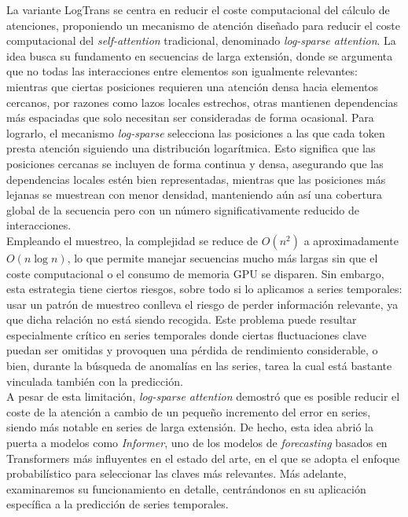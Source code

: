 La variante LogTrans\cite{NEURIPS2019_6775a063} se centra en reducir el coste computacional del cálculo de atenciones, proponiendo un mecanismo de atención diseñado para reducir el coste computacional del \textit{self-attention} tradicional, denominado \textit{log-sparse attention}. La idea busca su fundamento en secuencias de larga extensión, donde se argumenta que no todas las interacciones entre elementos son igualmente relevantes: mientras que ciertas posiciones requieren una atención densa hacia elementos cercanos, por razones como lazos locales estrechos, otras mantienen dependencias más espaciadas que solo necesitan ser consideradas de forma ocasional. Para lograrlo, el mecanismo \textit{log-sparse} selecciona las posiciones a las que cada token presta atención siguiendo una distribución logarítmica. Esto significa que las posiciones cercanas se incluyen de forma continua y densa, asegurando que las dependencias locales estén bien representadas, mientras que las posiciones más lejanas se muestrean con menor densidad, manteniendo aún así una cobertura global de la secuencia pero con un número significativamente reducido de interacciones.\\

Empleando el muestreo, la complejidad se reduce de \(O(n^2)\) a aproximadamente \(O(n \log n)\), lo que permite manejar secuencias mucho más largas sin que el coste computacional o el consumo de memoria GPU se disparen. Sin embargo, esta estrategia tiene ciertos riesgos, sobre todo si lo aplicamos a series temporales: usar un patrón de muestreo conlleva el riesgo de perder información relevante, ya que dicha relación no está siendo recogida. Este problema puede resultar especialmente crítico en series temporales donde ciertas fluctuaciones clave puedan ser omitidas y provoquen una pérdida de rendimiento considerable, o bien, durante la búsqueda de anomalías en las series, tarea la cual está bastante vinculada también con la predicción.\\

A pesar de esta limitación, \textit{log-sparse attention} demostró que es posible reducir el coste de la atención a cambio de un pequeño incremento del error en series, siendo más notable en series de larga extensión. De hecho, esta idea abrió la puerta a modelos como \textit{Informer}, uno de los modelos de \textit{forecasting} basados en Transformers más influyentes en el estado del arte,  en el que se adopta el enfoque probabilístico para seleccionar las claves más relevantes. Más adelante, examinaremos su funcionamiento en detalle, centrándonos en su aplicación específica a la predicción de series temporales.

